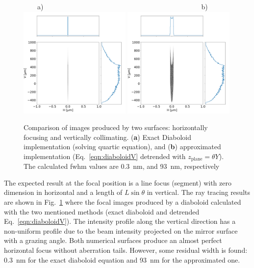 \documentclass{iucr}       %
\begin{document}
\begin{figure}\label{fig:pointToSegment}
\flushleft
~~~~a)~~~~~~~~~~~~~~~~~~~~~~~~~~~~~~~~~~~~~~~~~~~~~~b)\\
\centering
\includegraphics[width=0.49\textwidth]{figures/p2s_V_z.png}
\includegraphics[width=0.49\textwidth]{figures/p2s_K_z.png} \\
\flushleft
\caption{Comparison of images produced by two surfaces: horizontally focusing and vertically collimating. (\textbf{a}) Exact Diaboloid implementation (solving quartic equation), and (\textbf{b}) approximated implementation (Eq.~\ref{eqn:diaboloidV} detrended with $z_\mathrm{plane}=\theta Y$). The calculated fwhm values are 0.3~nm, and 93~nm, respectively
}
\end{figure}

The expected result at the focal position is a line focus (segment) with zero dimension in horizontal and a length of $L\sin\theta$ in vertical. The ray tracing results are shown in Fig.~\ref{fig:pointToSegment} where the focal images produced by a diaboloid calculated with the two mentioned methods (exact diaboloid and detrended Eq.~\ref{eqn:diaboloidV}). The intensity profile along the vertical direction has a non-uniform profile due to the beam intensity projected on the mirror surface with a grazing angle.
Both numerical surfaces produce an almost perfect horizontal focus without aberration tails. However, some residual width is found: \SI{0.3}{\nano\meter} for the exact diaboloid equation and \SI{93}{\nano\meter} for the approximated one. 
\end{document}
